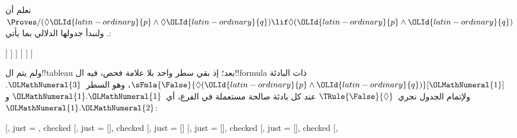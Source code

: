 \documentclass[../../../include/open-logic-section]{subfiles}
\begin{document}
{
\begin{ex}
  نعلم أن $\Proves/ (\Diamond \OLId{latin-ordinary}{p} \land \Diamond \OLId{latin-ordinary}{q}) \lif \Diamond(\OLId{latin-ordinary}{p}
  \land \OLId{latin-ordinary}{q})$. ولنبدأ جدولها الدلالي بما يأتي:
  \begin{oltableau}
    [\pFmla{\False}{(\Diamond p \land \Diamond q) \lif \Diamond(p \land q)}{\OLClassicalDigits{1}},
      just = \TAss, checked
      [\pFmla{\True}{\Diamond p \land \Diamond q}{\OLClassicalDigits{1}},
        just = {\TRule{\False}{\lif}[\OLClassicalDigits{1}]}, checked
        [\pFmla{\False}{\Diamond(p \land q)}{\OLClassicalDigits{1}},
          just = {\TRule{\False}{\lif}[\OLClassicalDigits{1}]}
          [\pFmla{\True}{\Diamond p}{\OLClassicalDigits{1}},
            just = {\TRule{\True}{\land}[\OLClassicalDigits{2}]}, checked
            [\pFmla{\True}{\Diamond q}{\OLClassicalDigits{1}},
              just = {\TRule{\True}{\land}[\OLClassicalDigits{2}]}, checked
              [\pFmla{\True}{p}{\OLClassicalDigits{1}.\OLClassicalDigits{1}}, 
                just = {\TRule{\True}{\Diamond}[\OLClassicalDigits{4}]}, checked
                [\pFmla{\True}{q}{\OLClassicalDigits{1}.\OLClassicalDigits{2}}, 
                  just = {\TRule{\True}{\Diamond}[\OLClassicalDigits{5}]}, checked
                ]
              ]
            ]
          ]
        ]
      ]
    ]
  \end{oltableau}
  ولم يتم ال!!{tableau} بعد؛ إذ بقي سطر واحد بلا علامة فحص، فيه
  ال!!{formula} ذات البادئة
  $\sFmla{\False}{\Diamond(\OLId{latin-ordinary}{p} \land \OLId{latin-ordinary}{q})}[\OLMathNumeral{1}]$، وهو السطر~$\OLMathNumeral{3}$.
  ولإتمام الجدول نجري~$\TRule{\False}{\Diamond}$ عند كل بادئة
  صالحة مستعملة في الفرع، أي~$\OLMathNumeral{1}.\OLMathNumeral{1}$ و$\OLMathNumeral{1}.\OLMathNumeral{2}$:
  \begin{oltableau}
    [,
      just = \TAss, checked
      [,
        just = {\TRule{\False}{\lif}[]}, checked
        [,
          just = {\TRule{\False}{\lif}[]}
          [,
            just = {\TRule{\True}{\land}[]}, checked
            [,
              just = {\TRule{\True}{\land}[]}, checked
              [, 

\end{oltableau}
\end{ex}}
\end{document}
